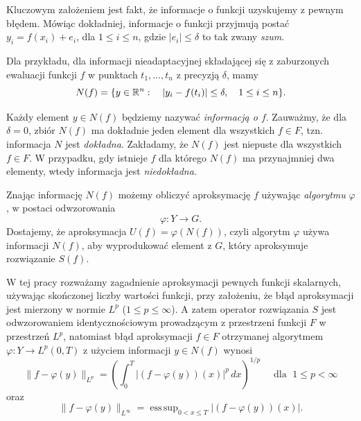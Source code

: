 \documentclass[oik, pdftex, man]{mgrwms}
\DeclareMathOperator*{\esssup}{ess\,sup}
\begin{document}
    Kluczowym założeniem jest fakt, że informacje o funkcji uzyskujemy z pewnym błędem. Mówiąc dokładniej, informacje o funkcji przyjmują postać $y_{i} = f(x_{i}) + e_{i}$, dla $1 \leq i \leq n$, gdzie $|e_{i}| \leq \delta$ to tak zwany \textit{szum}.
    
    Dla przykładu, dla informacji nieadaptacyjnej składającej się z zaburzonych ewaluacji funkcji $f$ w punktach $t_{1}, \dots, t_{n}$ z precyzją $\delta$, mamy
    \begin{equation*}
        N(f) = \{y \in \mathbb{R}^{n} : \quad |y_{i} - f(t_{i})| \leq \delta, \quad 1 \leq i \leq n\}.
    \end{equation*}
    
    Każdy element $y \in N(f)$ będziemy nazywać \textit{informacją o $f$}. Zauważmy, że dla $\delta = 0$, zbiór $N(f)$ ma dokładnie jeden element dla wszystkich $f \in F$, tzn. informacja $N$ jest \textit{dokładna}. Zakładamy, że $N(f)$ jest niepuste dla wszystkich $f \in F$. W przypadku, gdy istnieje $f$ dla którego $N(f)$ ma przynajmniej dwa elementy, wtedy informacja jest \textit{niedokładna}.

    Znając informację $N(f)$ możemy obliczyć aproksymację $f$ używając \textit{algorytmu} $\varphi$, w postaci odwzorowania
    \begin{equation*}
        \varphi : Y \rightarrow G.
    \end{equation*}
    Dostajemy, że aproksymacja $U(f) = \varphi(N(f))$, czyli algorytm $\varphi$ używa informacji $N(f)$, aby wyprodukować element z $G$, który aproksymuje rozwiązanie $S(f)$.

    W tej pracy rozważamy zagadnienie aproksymacji pewnych funkcji skalarnych, używając skończonej liczby wartości funkcji, przy założeniu, że błąd aproksymacji jest mierzony w normie $L^{p}$ ($1 \leq p \leq \infty$). A zatem operator rozwiązania $S$ jest odwzorowaniem identycznościowym prowadzącym z przestrzeni funkcji $F$ w przestrzeń $L^{p}$, natomiast błąd aproksymacji $f \in F$ otrzymanej algorytmem $\varphi : Y \rightarrow L^{p}(0,T)$ z użyciem informacji $y \in N(f)$ wynosi
    \begin{equation*}
        \|f-\varphi(y)\|_{L^p} = \left( \int_{0}^{T} |(f-\varphi(y))(x)|^p \,dx  \right)^{1/p} \quad \text{ dla } \; 1 \leq p < \infty
    \end{equation*}
    oraz
    \begin{equation*}
        \|f-\varphi(y)\|_{L^\infty} = \esssup_{0 < x \leq T} | (f - \varphi(y))(x) |.
    \end{equation*}
\end{document}
